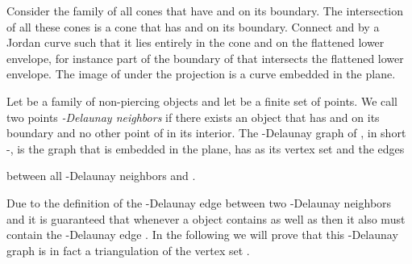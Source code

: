 \documentclass{stacs_proc}
\begin{document}
Consider the family of all cones that have  and  on its
boundary. The intersection of all these cones is a cone  that
has  and  on its boundary. Connect  and  by a Jordan curve
 such that it lies entirely in the cone  and on the
flattened lower envelope, for instance part of the boundary of
 that intersects the flattened lower envelope. The image of
 under the projection  is a curve  embedded in
the plane. 


\begin{defi}
  Let  be a family of non-piercing objects and let  be a
  finite set of points.  
  We call two points  \emph{-Delaunay
    neighbors} if there exists an object  that has  and  on
  its boundary and no other point of  in its interior. 
  The
  -Delaunay graph of , in short -, is the graph that
  is embedded in the plane, has  as its vertex set and the edges
    
  between all -Delaunay neighbors  and . 
\end{defi}
Due to the definition of the -Delaunay edge between two
-Delaunay neighbors  and  it is guaranteed that whenever a
object  contains  as well as  then it also must contain
the -Delaunay edge .  
In the following we will prove
that this -Delaunay graph is in fact a triangulation of the vertex
set . 
\end{document}

